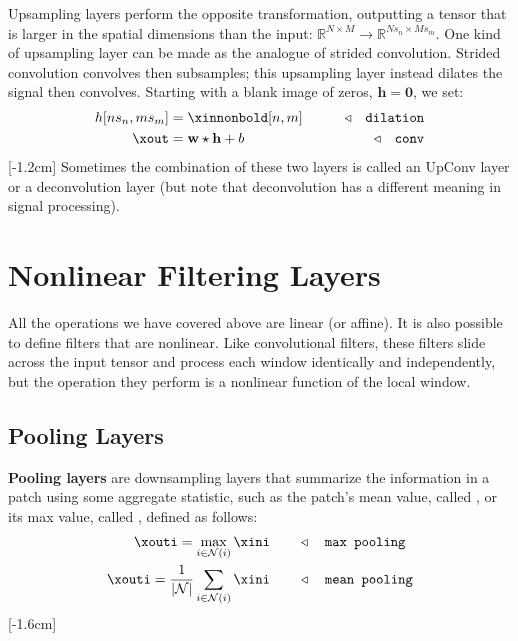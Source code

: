 Upsampling layers perform the opposite transformation, outputting a tensor that is larger in the spatial dimensions than the input: $\mathbb{R}^{N \times M} \rightarrow \mathbb{R}^{Ns_n \times Ms_m}$. One kind of upsampling layer can be made as the analogue of strided convolution. Strided convolution convolves then subsamples; this upsampling layer instead dilates the signal then convolves. Starting with a blank image of zeros, $\mathbf{h} = \mathbf{0}$, we set:
\begin{align}
    h[ns_n, ms_m] & = \xinnonbold[n, m]               & \quad\quad \triangleleft \quad \texttt{dilation}\label{eqn:convolutional_neural_nets:dilation} \\
    \xout         & = \mathbf{w} \star \mathbf{h} + b & \quad\quad \triangleleft \quad \texttt{conv}
\end{align}
[-1.2cm]
Sometimes the combination of these two layers is called an UpConv layer or a deconvolution layer (but note that deconvolution has a different meaning in signal processing).


\section{Nonlinear Filtering Layers}

All the operations we have covered above are linear (or affine). It is also possible to define filters that are nonlinear. Like convolutional filters, these filters slide across the input tensor and process each window identically and independently, but the operation they perform is a nonlinear function of the local window.

\subsection{Pooling Layers}\label{sec:convolutional_neural_nets:pooling_layers}

{\bf Pooling layers} are downsampling layers that summarize the information in a patch using some aggregate statistic, such as the patch's mean value, called , or its max value, called , defined as follows:
\begin{align}
    \xouti = \max_{i \in \mathcal{N}(i)} \xini                         & \quad\quad \triangleleft \quad \texttt{max pooling}\label{eqn:convolutional_neural_nets:max_pooling}   \\
    \xouti = \frac{1}{|\mathcal{N}|} \sum_{i \in \mathcal{N}(i)} \xini & \quad\quad \triangleleft \quad \texttt{mean pooling}\label{eqn:convolutional_neural_nets:mean_pooling}
\end{align}
[-1.6cm]

